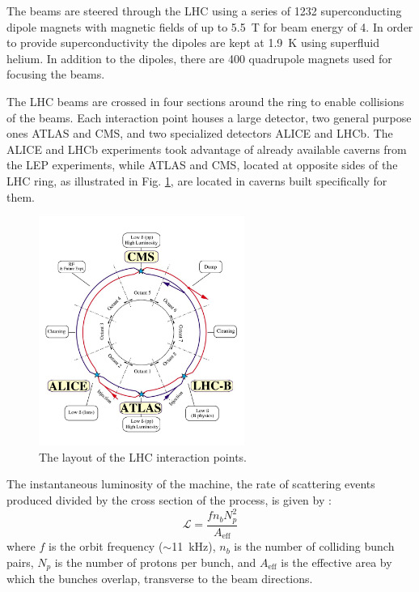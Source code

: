The beams are steered through the LHC 
using a series of 1232 superconducting dipole magnets with magnetic fields 
of up to 5.5~T for beam energy of 4\TeV. In order to provide superconductivity the 
dipoles are kept at 1.9~K using superfluid helium.
In addition to the dipoles, there are 400 quadrupole magnets used
for focusing the beams.

The LHC beams are
crossed in four sections around the ring to enable collisions of the beams. Each interaction point
houses a large detector, two general purpose ones ATLAS and CMS, and two specialized detectors
ALICE and LHCb. The ALICE and LHCb experiments took advantage of already available caverns from
the LEP experiments, while ATLAS and CMS, located at opposite sides of the LHC ring, as illustrated
in Fig. \ref{fig:lhc}, are located in caverns built specifically for them.

\begin{figure}[htbp]
\centering
\includegraphics[width=0.6\textwidth]{plots/intro/lhc.jpg}
\caption{The layout of the LHC interaction points.\label{fig:lhc}}
\end{figure}

The instantaneous luminosity of the machine, \ie the rate of scattering events produced divided
by the cross section of the process, is given by \cite{Aaij:2011er}:
\begin{equation}
\mathcal{L}=\frac{f n_b N_p^2}{A_{\mathrm{eff}}}
\end{equation}
where $f$ is the orbit frequency ($\sim$11~kHz), $n_b$ is the number of colliding bunch pairs, 
$N_p$ is the number of protons per bunch, and $A_{\mathrm{eff}}$ is the effective 
area by which the bunches
overlap, transverse to the beam directions.


